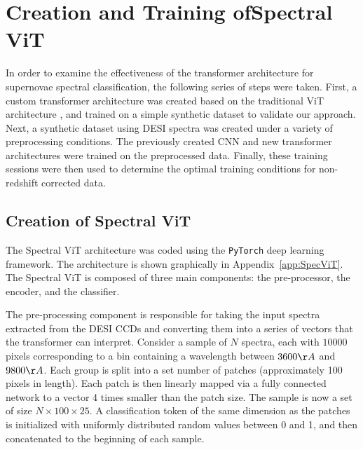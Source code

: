 \chapter[Creation and Training of Spectral ViT]{Creation and Training of\newline Spectral ViT}
\label{chap:methods}

In order to examine the effectiveness of the transformer architecture for supernovae
spectral classification, the following series of steps were taken. First, a custom transformer 
architecture was created based on the traditional ViT architecture \parencite{dosovitskiy2020}, 
and trained on a simple synthetic dataset to validate our approach. Next, a synthetic dataset 
using DESI spectra was created under a variety of preprocessing conditions. The previously 
created CNN and new transformer architectures were trained on the
preprocessed data. Finally, these training sessions were then used to determine 
the optimal training conditions for non-redshift corrected data. 

\section{Creation of Spectral ViT}\label{sec:SpecViT}
The Spectral ViT architecture was coded using the \texttt{PyTorch}
deep learning framework. The architecture is shown graphically in
Appendix~\ref{app:SpecViT}. The Spectral ViT is
composed of three main components: the pre-processor, the encoder, and the classifier. 

The pre-processing component is responsible for taking the 
input spectra extracted from the DESI CCDs and converting them into a series of 
vectors that the transformer can interpret. 
Consider a sample of $N$ spectra, each with $10000$ pixels corresponding to a bin containing a wavelength 
between $3600\AA$ and $9800\AA$. Each group is split into a set number of patches 
(approximately 100 pixels in length). Each patch is then 
linearly mapped via a fully connected network to a vector 4 times smaller than the patch size.
The sample is now a set of size $N\times100\times25$. A classification token of the same dimension as the patches 
is initialized with uniformly distributed random values between 0 and 1, and then concatenated to the beginning of each sample.

